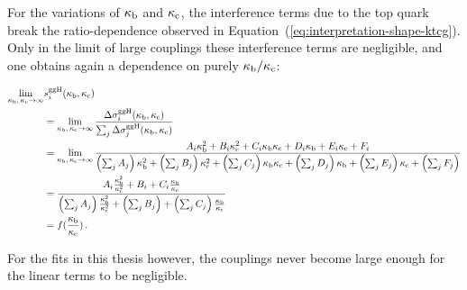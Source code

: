 For the variations of $\kappa_{\mathrm{b}}$ and $\kappa_{\mathrm{c}}$, the interference terms due to the top quark break the ratio-dependence observed in Equation~(\ref{eq:interpretation-shape-ktcg}).
% 
Only in the limit of large couplings these interference terms are negligible, and one obtains again a dependence on purely $\kappa_{\mathrm{b}}/\kappa_{\mathrm{c}}$:
% 
\begin{linenomath*}
\begin{equation}
\label{eq:interpretation-shape-kbkc}
\begin{split}
\lim_{\kappa_{\mathrm{b}},\,\kappa_{\mathrm{c}}\to\infty} & s^{\mathrm{g}\mathrm{g}\mathrm{H}}_i(\kappa_{\mathrm{b}}, \kappa_{\mathrm{c}}) \\
        &=
        \lim_{\kappa_{\mathrm{b}},\,\kappa_{\mathrm{c}}\to\infty}
        \frac
            {\Delta\sigma^{\mathrm{g}\mathrm{g}\mathrm{H}}_i(\kappa_{\mathrm{b}}, \kappa_{\mathrm{c}})}
            {\sum_j \Delta\sigma^{\mathrm{g}\mathrm{g}\mathrm{H}}_j(\kappa_{\mathrm{b}}, \kappa_{\mathrm{c}})}
            \\
        &=
        \lim_{\kappa_{\mathrm{b}},\,\kappa_{\mathrm{c}}\to\infty}
        \frac
            {A_i \kappa_{\mathrm{b}}^2 + B_i \kappa_{\mathrm{c}}^2 + C_i \kappa_{\mathrm{b}} \kappa_{\mathrm{c}}
                + D_i \kappa_{\mathrm{b}} + E_i \kappa_{\mathrm{c}} + F_i
                }
            {
                \left(\sum_j A_j\right) \kappa_{\mathrm{b}}^2
                + \left(\sum_j B_j\right) \kappa_{\mathrm{c}}^2
                + \left(\sum_j C_j\right) \kappa_{\mathrm{b}}\kappa_{\mathrm{c}}
                + \left(\sum_j D_j\right) \kappa_{\mathrm{b}}
                + \left(\sum_j E_j\right) \kappa_{\mathrm{c}}
                + \left(\sum_j F_j\right)
                }
            \\
        &=
        \frac
            {A_i \frac{\kappa_{\mathrm{b}}^2}{\kappa_{\mathrm{c}}^2} + B_i + C_i \frac{\kappa_{\mathrm{b}}}{\kappa_{\mathrm{c}}}}
            {
                \left(\sum_j A_j\right) \frac{\kappa_{\mathrm{b}}^2}{\kappa_{\mathrm{c}}^2}
                + \left(\sum_j B_j\right) 
                + \left(\sum_j C_j\right) \frac{\kappa_{\mathrm{b}}}{\kappa_{\mathrm{c}}}
                }
            \\
        & = f(\frac{\kappa_{\mathrm{b}}}{\kappa_{\mathrm{c}}})
\,.
\end{split}
\end{equation}
\end{linenomath*}
% 
For the fits in this thesis however, the couplings never become large enough for the linear terms to be negligible.









